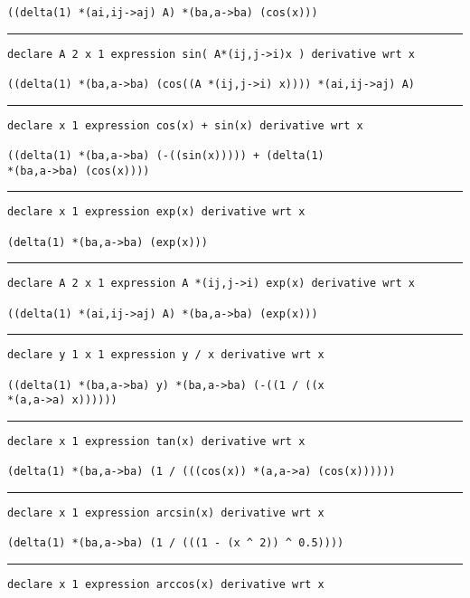 \documentclass[12pt, a4paper]{report}
\begin{document}
\begin{multicols}{2}
\begin{verbatim}
((delta(1) *(ai,ij->aj) A) *(ba,a->ba) (cos(x)))
\end{verbatim}
\vspace{-20pt} \rule[-10pt]{\columnwidth}{0.1pt} 
\begin{verbatim}
declare A 2 x 1 expression sin( A*(ij,j->i)x ) derivative wrt x

((delta(1) *(ba,a->ba) (cos((A *(ij,j->i) x)))) *(ai,ij->aj) A)
\end{verbatim}
\vspace{-20pt} \rule[-10pt]{\columnwidth}{0.1pt} 
\begin{verbatim}
declare x 1 expression cos(x) + sin(x) derivative wrt x

((delta(1) *(ba,a->ba) (-((sin(x))))) + (delta(1) 
*(ba,a->ba) (cos(x))))
\end{verbatim}
\vspace{-20pt} \rule[-10pt]{\columnwidth}{0.1pt} 
\begin{verbatim}
declare x 1 expression exp(x) derivative wrt x

(delta(1) *(ba,a->ba) (exp(x)))
\end{verbatim}
\vspace{-20pt} \rule[-10pt]{\columnwidth}{0.1pt} 
\begin{verbatim}
declare A 2 x 1 expression A *(ij,j->i) exp(x) derivative wrt x

((delta(1) *(ai,ij->aj) A) *(ba,a->ba) (exp(x)))
\end{verbatim}
\vspace{-20pt} \rule[-10pt]{\columnwidth}{0.1pt} 
\begin{verbatim}
declare y 1 x 1 expression y / x derivative wrt x

((delta(1) *(ba,a->ba) y) *(ba,a->ba) (-((1 / ((x 
*(a,a->a) x))))))
\end{verbatim}
\vspace{-20pt} \rule[-10pt]{\columnwidth}{0.1pt} 
\begin{verbatim}
declare x 1 expression tan(x) derivative wrt x

(delta(1) *(ba,a->ba) (1 / (((cos(x)) *(a,a->a) (cos(x))))))
\end{verbatim}
\vspace{-20pt} \rule[-10pt]{\columnwidth}{0.1pt} 
\begin{verbatim}
declare x 1 expression arcsin(x) derivative wrt x

(delta(1) *(ba,a->ba) (1 / (((1 - (x ^ 2)) ^ 0.5))))
\end{verbatim}
\vspace{-20pt} \rule[-10pt]{\columnwidth}{0.1pt} 
\begin{verbatim}
declare x 1 expression arccos(x) derivative wrt x


\end{verbatim}
\end{multicols}
\end{document}
